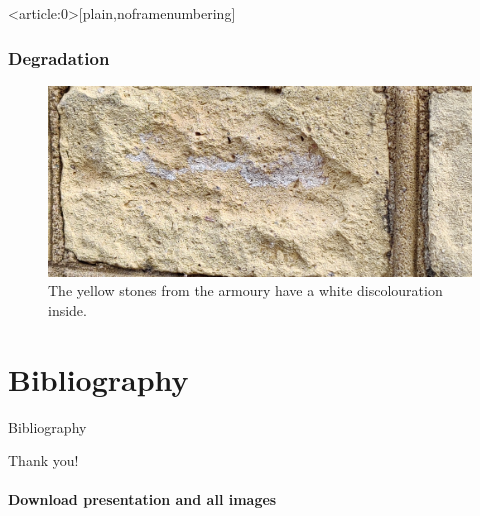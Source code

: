 \documentclass[light]{lutbeamer} %
\begin{document}
{ %
    \begin{frame}<article:0>[plain,noframenumbering]
    \end{frame}
}

\begin{frame}
    \frametitle{Degradation}
    \vspace{5mm}
    \begin{figure}
        \centering
            \includegraphics[height=0.65\paperheight]{figures/white_inside_zeughaus.jpg}
            \caption{The yellow stones from the armoury have a white discolouration inside.}
        \label{fig:enter-label}
    \end{figure}
\end{frame}

\section*{Bibliography}
\begin{frame}[fragile]{Bibliography}

\printbibliography
\end{frame}

\appendix

\begin{frame}{Thank you!}
    \framesubtitle{Download presentation and all images}
    \vspace{0.5in}
    \centering
\end{frame}
\end{document}
